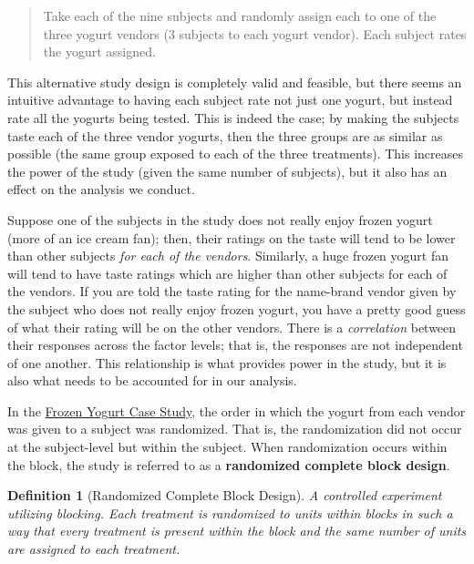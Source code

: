 \documentclass[
]{book}
\theoremstyle{plain}
\theoremstyle{mydefn}
\newtheorem{definition}{Definition}[chapter]
\theoremstyle{myexmpl}
\theoremstyle{remark}
\begin{document}
\begin{quote}
Take each of the nine subjects and randomly assign each to one of the three yogurt vendors (3 subjects to each yogurt vendor). Each subject rates the yogurt assigned.
\end{quote}

This alternative study design is completely valid and feasible, but there seems an intuitive advantage to having each subject rate not just one yogurt, but instead rate all the yogurts being tested. This is indeed the case; by making the subjects taste each of the three vendor yogurts, then the three groups are as similar as possible (the same group exposed to each of the three treatments). This increases the power of the study (given the same number of subjects), but it also has an effect on the analysis we conduct.

Suppose one of the subjects in the study does not really enjoy frozen yogurt (more of an ice cream fan); then, their ratings on the taste will tend to be lower than other subjects \emph{for each of the vendors}. Similarly, a huge frozen yogurt fan will tend to have taste ratings which are higher than other subjects for each of the vendors. If you are told the taste rating for the name-brand vendor given by the subject who does not really enjoy frozen yogurt, you have a pretty good guess of what their rating will be on the other vendors. There is a \emph{correlation} between their responses across the factor levels; that is, the responses are not independent of one another. This relationship is what provides power in the study, but it is also what needs to be accounted for in our analysis.

In the \protect\hyperlink{CaseYogurt}{Frozen Yogurt Case Study}, the order in which the yogurt from each vendor was given to a subject was randomized. That is, the randomization did not occur at the subject-level but within the subject. When randomization occurs within the block, the study is referred to as a \textbf{randomized complete block design}.

\begin{definition}[Randomized Complete Block Design]
\protect\hypertarget{def:defn-rcbd}{}{\label{def:defn-rcbd} {} }A controlled experiment utilizing blocking. Each treatment is randomized to units within blocks in such a way that every treatment is present within the block and the same number of units are assigned to each treatment.
\end{definition}
\end{document}
